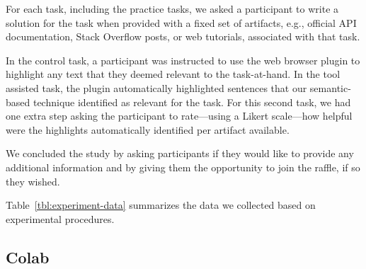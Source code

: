 {For each task, including the practice tasks, we asked a participant to write a solution for the task
when provided with a fixed set of artifacts, e.g., official API documentation, Stack Overflow posts, or web tutorials, 
associated with that task.  


In the control task, a participant was instructed to use the web browser plugin to highlight any text that they deemed relevant to the task-at-hand. 
In the tool assisted task, the plugin automatically highlighted sentences that our semantic-based technique identified as relevant for the task. 
For this second task, we had one extra step asking the participant to rate---using a Likert scale---how helpful were the highlights automatically identified per artifact available. 


We concluded the study by asking participants if they would like to provide any additional information and 
by giving them the opportunity to join the raffle, if so they wished. 









Table~\ref{tbl:experiment-data} summarizes the data we collected based on experimental procedures.




\subsection{Colab}
\label{cp6:environment}


}

